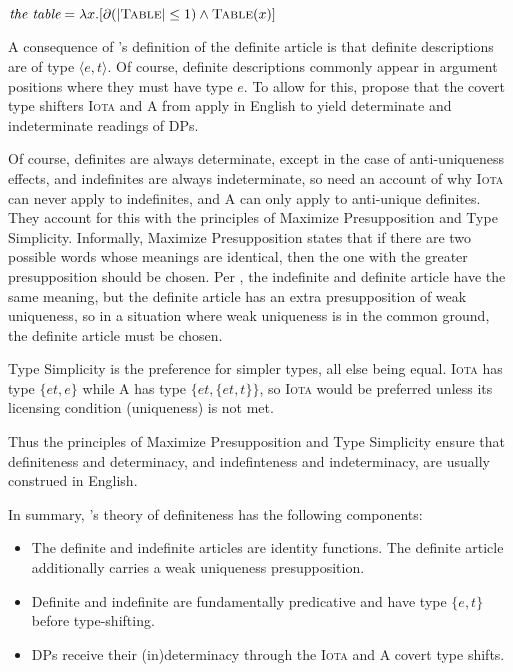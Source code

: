 \begin{exe}
	\ex \label{the-table} $\textit{the table} = \lambda x . [ \partial(|\textsc{Table}| \le 1) \land \textsc{Table}(x) ]$
\end{exe}

A consequence of \citeauthor{cb2015}'s definition of the definite article is that definite descriptions are of type $\langle e, t \rangle$. Of course, definite descriptions commonly appear in argument positions where they must have type $e$. To allow for this, \citeauthor{cb2015} propose that the covert type shifters \textsc{Iota} and \textsc{A} from \citet{partee86} apply in English to yield determinate and indeterminate readings of DPs.

Of course, definites are always determinate, except in the case of anti-uniqueness effects, and indefinites are always indeterminate, so \citeauthor{cb2015} need an account of why \textsc{Iota} can never apply to indefinites, and \textsc{A} can only apply to anti-unique definites. They account for this with the principles of Maximize Presupposition and Type Simplicity. Informally, Maximize Presupposition states that if there are two possible words whose meanings are identical, then the one with the greater presupposition should be chosen. Per \citeauthor{cb2015}, the indefinite and definite article have the same meaning, but the definite article has an extra presupposition of weak uniqueness, so in a situation where weak uniqueness is in the common ground, the definite article must be chosen.

Type Simplicity is the preference for simpler types, all else being equal. \textsc{Iota} has type $\lbrace et, e \rbrace$ while \textsc{A} has type $\lbrace et, \lbrace et, t \rbrace \rbrace$, so \textsc{Iota} would be preferred unless its licensing condition (uniqueness) is not met.

Thus the principles of Maximize Presupposition and Type Simplicity ensure that definiteness and determinacy, and indefinteness and indeterminacy, are usually construed in English.

In summary, \citeauthor{cb2015}'s theory of definiteness has the following components:

\begin{itemize}
	\item The definite and indefinite articles are identity functions. The definite article additionally carries a weak uniqueness presupposition.
	\item Definite and indefinite are fundamentally predicative and have type $\lbrace e, t \rbrace$ before type-shifting.
	\item DPs receive their (in)determinacy through the \textsc{Iota} and \textsc{A} covert type shifts.
\end{itemize}


